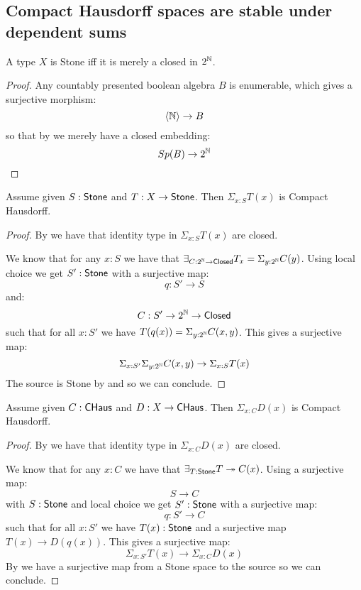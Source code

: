 \subsection{Compact Hausdorff spaces are stable under dependent sums}

\begin{lemma}
A type $X$ is Stone iff it is merely a closed in $2^{\mathbb{N}}$.
\end{lemma}

\begin{proof}
Any countably presented boolean algebra $B$ is enumerable, which gives a surjective morphism:
$$ \langle\mathbb{N}\rangle\to B$$
so that by  we merely have a closed embedding:
$$ Sp(B)\to 2^{\mathbb{N}}$$
\end{proof}

\begin{lemma}\label{SigmaStoneCompactHausdorff}
Assume given $S:\mathsf{Stone}$ and $T:X\to \mathsf{Stone}$. Then $\Sigma_{x:S}T(x)$ is Compact Hausdorff.
\end{lemma}

\begin{proof}
By  we have that identity type in $\Sigma_{x:S}T(x)$ are closed.

We know that for any $x:S$ we have that $\exists_{C:2^{\mathbb{N}}\to \mathsf{Closed}} T_x = \Sigma_{y:2^{\mathbb{N}}}C(y)$. Using local choice we get $S':\mathsf{Stone}$ with a surjective map:
$$q:S'\to S$$
and:
$$ C : S'\to 2^{\mathbb{N}}\to\mathsf{Closed}$$
such that for all $x:S'$ we have $T(q(x)) = \Sigma_{y:2^{\mathbb{N}}}C(x,y)$. This gives a surjective map:
$$ \Sigma_{x:S'}\Sigma_{y:2^{\mathbb{N}}} C(x,y)\to \Sigma_{x:S}T(x)$$
The source is Stone by  and  so we can conclude.
\end{proof}

\begin{lemma}
Assume given $C:\mathsf{CHaus}$ and $D:X\to \mathsf{CHaus}$. Then $\Sigma_{x:C}D(x)$ is Compact Hausdorff.
\end{lemma}

\begin{proof}
By  we have that identity type in $\Sigma_{x:C}D(x)$ are closed.

We know that for any $x:C$ we have that $\exists_{T:\mathsf{Stone}} T\twoheadrightarrow C(x)$. Using a surjective map:
$$ S\to C$$
with $S:\mathsf{Stone}$ and local choice we get $S':\mathsf{Stone}$ with a surjective map:
$$q:S'\to C$$
such that for all $x:S'$ we have $T(x):\mathsf{Stone}$ and a surjective map $T(x)\to D(q(x))$. This gives a surjective map:
$$ \Sigma_{x:S'}T(x)\to \Sigma_{x:C}D(x)$$
By  we have a surjective map from a Stone space to the source so we can conclude.
\end{proof}